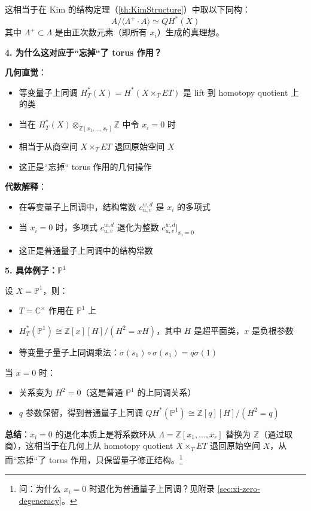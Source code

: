 这相当于在 Kim 的结构定理（\cref{th:KimStructure}）中取以下同构：
$$A / \langle \Lambda^{+} \cdot A \rangle \simeq QH^*(X)$$
其中 $\Lambda^{+} \subset \Lambda$ 是由正次数元素（即所有 $x_i$）生成的真理想。

\textbf{4. 为什么这对应于``忘掉``了 torus 作用？}

\textbf{几何直觉}：
\begin{itemize}
\item 等变量子上同调 $H_T^*(X) = H^*(X \times_T ET)$ 是 lift 到 homotopy quotient 上的类
\item 当在 $H_T^*(X) \otimes_{\mathbb{Z}[x_1,\ldots,x_r]} \mathbb{Z}$ 中令 $x_i = 0$ 时
\item 相当于从商空间 $X \times_T ET$ 退回原始空间 $X$
\item 这正是``忘掉`` torus 作用的几何操作
\end{itemize}

\textbf{代数解释}：
\begin{itemize}
\item 在等变量子上同调中，结构常数 $c_{u,v}^{w,d}$ 是 $x_i$ 的多项式
\item 当 $x_i = 0$ 时，多项式 $c_{u,v}^{w,d}$ 退化为整数 $c_{u,v}^{w,d}\big|_{x_i=0}$
\item 这正是普通量子上同调中的结构常数
\end{itemize}

\textbf{5. 具体例子：$\mathbb{P}^1$}

设 $X = \mathbb{P}^1$，则：
\begin{itemize}
\item $T = \mathbb{C}^\times$ 作用在 $\mathbb{P}^1$ 上
\item $H_T^*(\mathbb{P}^1) \cong \mathbb{Z}[x][H] / (H^2 = x H)$，其中 $H$ 是超平面类，$x$ 是负根参数
\item 等变量子量子上同调乘法：$\sigma(s_1) \circ \sigma(s_1) = q \sigma(1)$
\end{itemize}

当 $x = 0$ 时：
\begin{itemize}
\item 关系变为 $H^2 = 0$（这是普通 $\mathbb{P}^1$ 的上同调关系）
\item $q$ 参数保留，得到普通量子上同调 $QH^*(\mathbb{P}^1) \cong \mathbb{Z}[q][H] / (H^2 = q)$
\end{itemize}

\textbf{总结}：$x_i = 0$ 的退化本质上是将系数环从 $\Lambda = \mathbb{Z}[x_1,\ldots,x_r]$ 替换为 $\mathbb{Z}$（通过取商），这相当于在几何上从 homotopy quotient $X \times_T ET$ 退回原始空间 $X$，从而``忘掉``了 torus 作用，只保留量子修正结构。\footnote{问：为什么 $x_i = 0$ 时退化为普通量子上同调？见附录 \cref{sec:xi-zero-degeneracy}。}

